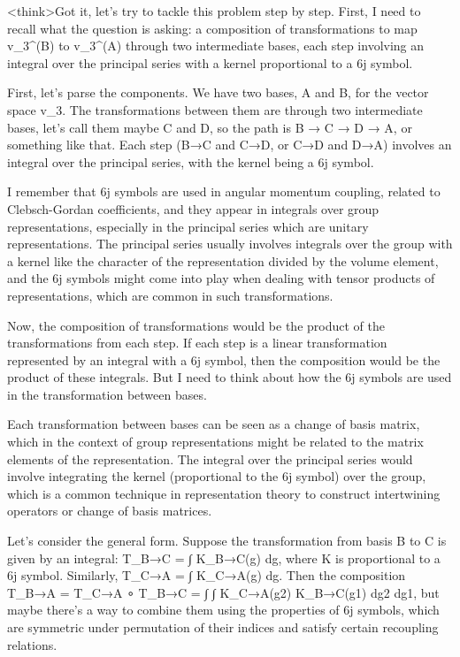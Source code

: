 <think>Got it, let's try to tackle this problem step by step. First, I need to recall what the question is asking: a composition of transformations to map v_3^(B) to v_3^(A) through two intermediate bases, each step involving an integral over the principal series with a kernel proportional to a 6j symbol. 

First, let's parse the components. We have two bases, A and B, for the vector space v_3. The transformations between them are through two intermediate bases, let's call them maybe C and D, so the path is B → C → D → A, or something like that. Each step (B→C and C→D, or C→D and D→A) involves an integral over the principal series, with the kernel being a 6j symbol. 

I remember that 6j symbols are used in angular momentum coupling, related to Clebsch-Gordan coefficients, and they appear in integrals over group representations, especially in the principal series which are unitary representations. The principal series usually involves integrals over the group with a kernel like the character of the representation divided by the volume element, and the 6j symbols might come into play when dealing with tensor products of representations, which are common in such transformations.

Now, the composition of transformations would be the product of the transformations from each step. If each step is a linear transformation represented by an integral with a 6j symbol, then the composition would be the product of these integrals. But I need to think about how the 6j symbols are used in the transformation between bases. 

Each transformation between bases can be seen as a change of basis matrix, which in the context of group representations might be related to the matrix elements of the representation. The integral over the principal series would involve integrating the kernel (proportional to the 6j symbol) over the group, which is a common technique in representation theory to construct intertwining operators or change of basis matrices.

Let's consider the general form. Suppose the transformation from basis B to C is given by an integral: T_{B→C} = ∫ K_{B→C}(g) dg, where K is proportional to a 6j symbol. Similarly, T_{C→A} = ∫ K_{C→A}(g) dg. Then the composition T_{B→A} = T_{C→A} ∘ T_{B→C} = ∫ ∫ K_{C→A}(g2) K_{B→C}(g1) dg2 dg1, but maybe there's a way to combine them using the properties of 6j symbols, which are symmetric under permutation of their indices and satisfy certain recoupling relations.

